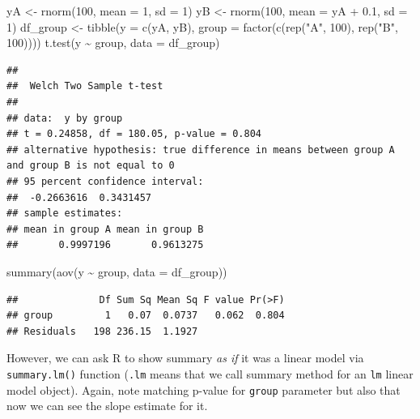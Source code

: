 \documentclass[
]{book}
\newenvironment{Shaded}{\begin{snugshade}}{\end{snugshade}}
\newcommand{\AttributeTok}[1]{\textcolor[rgb]{0.77,0.63,0.00}{#1}}
\newcommand{\DecValTok}[1]{\textcolor[rgb]{0.00,0.00,0.81}{#1}}
\newcommand{\FloatTok}[1]{\textcolor[rgb]{0.00,0.00,0.81}{#1}}
\newcommand{\FunctionTok}[1]{\textcolor[rgb]{0.00,0.00,0.00}{#1}}
\newcommand{\NormalTok}[1]{#1}
\newcommand{\OtherTok}[1]{\textcolor[rgb]{0.56,0.35,0.01}{#1}}
\newcommand{\SpecialCharTok}[1]{\textcolor[rgb]{0.00,0.00,0.00}{#1}}
\newcommand{\StringTok}[1]{\textcolor[rgb]{0.31,0.60,0.02}{#1}}
\begin{document}
\begin{Shaded}
\begin{Highlighting}[]
\NormalTok{yA }\OtherTok{\textless{}{-}} \FunctionTok{rnorm}\NormalTok{(}\DecValTok{100}\NormalTok{, }\AttributeTok{mean =} \DecValTok{1}\NormalTok{, }\AttributeTok{sd =} \DecValTok{1}\NormalTok{)}
\NormalTok{yB }\OtherTok{\textless{}{-}} \FunctionTok{rnorm}\NormalTok{(}\DecValTok{100}\NormalTok{, }\AttributeTok{mean =}\NormalTok{ yA }\SpecialCharTok{+} \FloatTok{0.1}\NormalTok{, }\AttributeTok{sd =} \DecValTok{1}\NormalTok{)}
\NormalTok{df\_group }\OtherTok{\textless{}{-}}
  \FunctionTok{tibble}\NormalTok{(}\AttributeTok{y =} \FunctionTok{c}\NormalTok{(yA, yB),}
         \AttributeTok{group =} \FunctionTok{factor}\NormalTok{(}\FunctionTok{c}\NormalTok{(}\FunctionTok{rep}\NormalTok{(}\StringTok{"A"}\NormalTok{, }\DecValTok{100}\NormalTok{), }\FunctionTok{rep}\NormalTok{(}\StringTok{"B"}\NormalTok{, }\DecValTok{100}\NormalTok{))))}
\FunctionTok{t.test}\NormalTok{(y }\SpecialCharTok{\textasciitilde{}}\NormalTok{ group, }\AttributeTok{data =}\NormalTok{ df\_group)}
\end{Highlighting}
\end{Shaded}

\begin{verbatim}
## 
##  Welch Two Sample t-test
## 
## data:  y by group
## t = 0.24858, df = 180.05, p-value = 0.804
## alternative hypothesis: true difference in means between group A and group B is not equal to 0
## 95 percent confidence interval:
##  -0.2663616  0.3431457
## sample estimates:
## mean in group A mean in group B 
##       0.9997196       0.9613275
\end{verbatim}

\begin{Shaded}
\begin{Highlighting}[]
\FunctionTok{summary}\NormalTok{(}\FunctionTok{aov}\NormalTok{(y }\SpecialCharTok{\textasciitilde{}}\NormalTok{ group, }\AttributeTok{data =}\NormalTok{ df\_group))}
\end{Highlighting}
\end{Shaded}

\begin{verbatim}
##              Df Sum Sq Mean Sq F value Pr(>F)
## group         1   0.07  0.0737   0.062  0.804
## Residuals   198 236.15  1.1927
\end{verbatim}

However, we can ask R to show summary \emph{as if} it was a linear model via \texttt{summary.lm()} function (\texttt{.lm} means that we call summary method for an \texttt{lm} linear model object). Again, note matching p-value for \texttt{group} parameter but also that now we can see the slope estimate for it.
\end{document}
